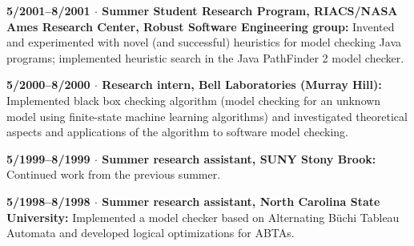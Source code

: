 \documentclass[ComputerScience]{vita}
\begin{document}
\begin{vita}
\begin{Experience}
  \item {\bf 5/2001--8/2001 $\cdot$  Summer Student Research Program, RIACS/NASA Ames Research Center, Robust Software Engineering group:}  Invented and experimented with novel (and successful) heuristics for model checking Java programs; implemented heuristic search in the Java PathFinder 2 model checker.

  \item {\bf 5/2000--8/2000 $\cdot$  Research intern, Bell Laboratories (Murray Hill):}  Implemented black box checking algorithm (model checking for an unknown model using finite-state machine learning algorithms) and investigated theoretical aspects and applications of the algorithm to software model checking.

  \item {\bf 5/1999--8/1999 $\cdot$ Summer research assistant, SUNY Stony Brook:}  Continued work from the previous summer.

  \item {\bf 5/1998--8/1998 $\cdot$ Summer research assistant, North Carolina State University:}   Implemented a model checker based on Alternating B\"uchi Tableau Automata and developed logical optimizations for ABTAs.

\end{Experience}


\end{vita}
\end{document}
